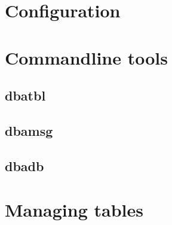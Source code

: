 \section {Configuration}



\section {Commandline tools}

\subsection{dbatbl}

\subsection{dbamsg}

\subsection{dbadb}

\section {Managing tables}




